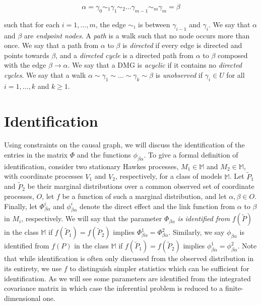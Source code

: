 \documentclass[accepted]{uai2021} %
\begin{document}
$$
\alpha = \gamma_0 \sim_1 \gamma_1 \sim_2 \ldots \gamma_{m-1} \sim_m \gamma_{m} 
= \beta
$$

such that for each $i = 1,\ldots,m$, the edge $\sim_i$ is between 
$\gamma_{i-1}$ and $\gamma_i$. We say that $\alpha$ and $\beta$ are 
\emph{endpoint nodes}. A {\it path} is a walk such that no node occurs 
more than once. We say that a path from $\alpha$ to $\beta$ is \emph{directed} 
if every edge is directed and points towards $\beta$, and a \emph{directed 
cycle} is a directed path from $\alpha$ to $\beta$ composed with the edge 
$\beta\rightarrow\alpha$. We say that a DMG is \emph{acyclic} if it contains no 
\emph{directed cycles}. We say that a walk $\alpha \sim \gamma_1 \sim \ldots 
\sim 
\gamma_k \sim \beta$ is \emph{unobserved} if $\gamma_i \in U$ for all $i = 
1,\ldots, k$ and $k \geq 1$. 




\section{Identification}

Using constraints on the causal graph, we will discuss the identification of 
the entries in the 
matrix $\Phi$ and the functions $\phi_{\beta\alpha}$. To give a formal 
definition 
of 
identification, consider two stationary Hawkes 
processes, $M_1\in\mathbb{M}$ and $M_2\in\mathbb{M}$, with coordinate processes 
$V_1$ and $V_2$, 
respectively, for a class of models $\mathbb{M}$. Let $ \tilde{P}_1$ and $ 
\tilde{P}_2$ be their marginal 
distributions over a common observed set of 
coordinate processes, $O$, let $f$ be a function of 
such a marginal distribution, and let 
$\alpha,\beta\in O$. Finally, let $\Phi_{\beta\alpha}^i$ and 
$\phi_{\beta\alpha}^i$ 
denote the direct effect and the link function from $\alpha$ to 
$\beta$ in $M_i$, respectively. We will say that the parameter 
$\Phi_{\beta\alpha}$ \emph{is 
identified from} 
$f(\tilde{P})$ in the class $\mathbb{M}$ if $f(\tilde{P}_1) = f(\tilde{P}_2)$ 
implies $\Phi_{\beta\alpha}^1 = \Phi_{\beta\alpha}^2$. Similarly, we say 
$\phi_{\beta\alpha}$ is identified from $f(P)$ in the class $\mathbb{M}$ if 
$f(\tilde{P}_1) = 
f(\tilde{P}_2)$ 
implies $\phi_{\beta\alpha}^1 = \phi_{\beta\alpha}^2$. Note that while 
identification 
is often only discussed from the 
observed distribution in its entirety, we use $f$ to distinguish simpler 
statistics which can be sufficient for identification. As we will see some 
parameters are identified from the integrated covariance matrix in which case 
the inferential problem is reduced to a finite-dimensional one.
\end{document}
